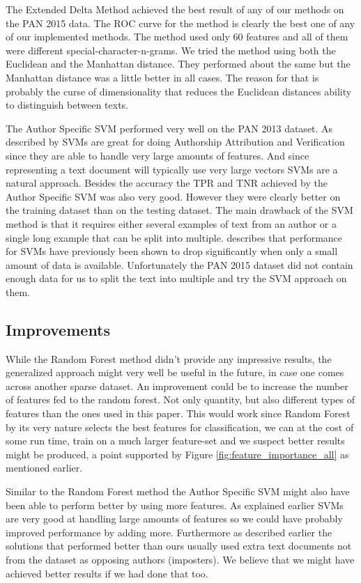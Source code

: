 The Extended Delta Method achieved the best result of any of our methods on the
PAN 2015 data. The ROC curve for the method is clearly the best one of any of
our implemented methods. The method used only 60 features and all of them were
different special-character-n-grams. We tried the method using both the
Euclidean and the Manhattan distance. They performed about the same but the
Manhattan distance was a little better in all cases. The reason for that is
probably the curse of dimensionality that reduces the Euclidean distances
ability to distinguish between texts.

The Author Specific SVM performed very well on the PAN 2013 dataset.
As described by \cite{stamatos2009} \gls{SVM}s are great for doing Authorship
Attribution and Verification since they are able to handle very large
amounts of features. And since representing a text document will typically use
very large vectors \gls{SVM}s are a natural approach. Besides the accuracy the
\gls{TPR} and \gls{TNR} achieved by the Author Specific SVM was also very good.
However they were clearly better on the training dataset than on the testing
dataset. The main drawback of the SVM method is that it requires either several
examples of text from an author or a single long example that can be split into
multiple. \cite{stamatos2009} describes that performance for \gls{SVM}s have
previously been shown to drop significantly when only a small amount of data is
available. Unfortunately the PAN 2015 dataset did not contain enough data for us
to split the text into multiple and try the SVM approach on them.

\subsection{Improvements}
While the Random Forest method didn't provide any impressive results, the
generalized approach might very well be useful in the future, in case one
comes across another sparse dataset. An improvement could be to increase the
number of features fed to the random forest. Not only quantity, but also
different types of features than the ones used in this paper. This would
work since Random Forest by its very nature selects the best features for
classification, we can at the cost of some run time, train on a much larger
feature-set and we suspect better results might be produced, a point supported
by Figure \ref{fig:feature_importance_all} as mentioned earlier.

Similar to the Random Forest method the Author Specific SVM might also have been
able to perform better by using more features. As explained earlier \gls{SVM}s are
very good at handling large amounts of features so we could have probably
improved performance by adding more. Furthermore as described earlier the
solutions that performed better than ours usually used extra text documents not
from the dataset as opposing authors (imposters). We believe that we might have
achieved better results if we had done that too.

